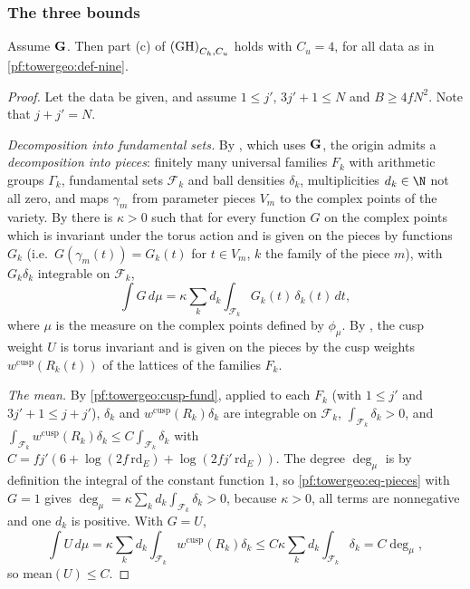\subsubsection*{The three bounds}

\begin{proposition}\label{pf:towergeo:meanU}
Assume $\mathbf G$. Then part (c) of $\textup{(GH)}_{C_h,C_u}$ holds with $C_u=4$, for all data as in
\cref{pf:towergeo:def-nine}.
\end{proposition}

\begin{proof}
Let the data be given, and assume $1\le j'$, $3j'+1\le N$ and $B\ge4fN^2$. Note that $j+j'=N$.

\emph{Decomposition into fundamental sets.} By , which uses
$\mathbf G$, the origin admits a \emph{decomposition into pieces}: finitely many universal families
$F_k$ with arithmetic groups $\Gamma_k$, fundamental sets $\mathcal F_k$ and ball densities $\delta_k$,
multiplicities $d_k\in\N$ not all zero, and maps $\gamma_m$ from parameter pieces $V_m$ to the complex
points of the variety. By  there is
$\kappa>0$ such that for every function $G$ on the complex points which is invariant under the torus action
and is given on the pieces by functions $G_k$ (i.e.\ $G(\gamma_m(t))=G_k(t)$ for $t\in V_m$, $k$ the family
of the piece $m$), with $G_k\delta_k$ integrable on $\mathcal F_k$,
\begin{equation}\label{pf:towergeo:eq-pieces}
\int G\,d\mu=\kappa\sum_kd_k\int_{\mathcal F_k}G_k(t)\,\delta_k(t)\,dt,
\end{equation}
where $\mu$ is the measure on the complex points defined by $\phi_\mu$. By
, the cusp weight $U$ is torus invariant and is given on the
pieces by the cusp weights $w^{\mathrm{cusp}}(R_k(t))$ of the lattices of the families $F_k$.

\emph{The mean.} By \cref{pf:towergeo:cusp-fund}, applied to each $F_k$ (with $1\le j'$ and
$3j'+1\le j+j'$), $\delta_k$ and $w^{\mathrm{cusp}}(R_k)\delta_k$ are integrable on $\mathcal F_k$,
$\int_{\mathcal F_k}\delta_k>0$, and
$\int_{\mathcal F_k}w^{\mathrm{cusp}}(R_k)\delta_k\le C\int_{\mathcal F_k}\delta_k$ with
$C=fj'(6+\log(2f\,\mathrm{rd}_E)+\log(2fj'\,\mathrm{rd}_E))$. The degree $\deg_\mu$ is by definition the
integral of the constant function $1$, so \eqref{pf:towergeo:eq-pieces} with $G=1$ gives
$\deg_\mu=\kappa\sum_kd_k\int_{\mathcal F_k}\delta_k>0$, because $\kappa>0$, all terms are nonnegative and one
$d_k$ is positive. With $G=U$,
\[
\int U\,d\mu=\kappa\sum_kd_k\int_{\mathcal F_k}w^{\mathrm{cusp}}(R_k)\delta_k\le
C\kappa\sum_kd_k\int_{\mathcal F_k}\delta_k=C\deg_\mu,
\]
so $\mathrm{mean}(U)\le C$.


\end{proof}

